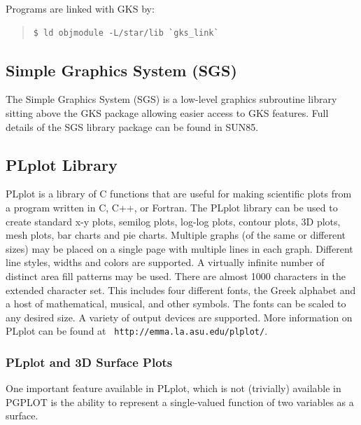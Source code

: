 \documentclass[twoside,11pt]{article}
\newcommand{\htmlref}[2]{#1}
\newcommand{\latex}[1]{#1}
\newcommand{\xref}[3]{#1}
\newcommand{\xlabel}[1]{}
\begin{document}
Programs are linked with GKS by:

\small
\begin{quote}
\begin{verbatim}
$ ld objmodule -L/star/lib `gks_link`
\end{verbatim}
\end{quote}
\normalsize

\subsection{\xlabel{sc15_sgs}Simple Graphics System (SGS)\label{sc15_sgs}}

The \xref{Simple Graphics System}{sun85}{} (SGS) is a low-level
graphics subroutine library sitting above the \htmlref{GKS}{sc15_gks}
package allowing easier access to GKS features. Full details of the
SGS library package can be found in \xref{SUN85}{sun85}{}.

\subsection{\xlabel{sc15_plplot}PLplot Library\label{sc15_plplot}}

PLplot is a library of C functions that are useful for making
scientific plots from a program written in C, C++, or Fortran. The
PLplot library can be used to create standard x-y plots, semilog
plots, log-log plots, contour plots, 3D plots, mesh plots, bar charts
and pie charts. Multiple graphs (of the same or different sizes) may
be placed on a single page with multiple lines in each graph.
Different line styles, widths and colors are supported. A virtually
infinite number of distinct area fill patterns may be used. There are
almost 1000 characters in the extended character set. This includes
four different fonts, the Greek alphabet and a host of mathematical,
musical, and other symbols. The fonts can be scaled to any desired
size. A variety of output devices are supported. \latex{More
information on PLplot can be found at {\tt
http://emma.la.asu.edu/plplot/}.}

\subsubsection{PLplot and 3D Surface Plots}

One important feature available in PLplot, which is not (trivially)
available in PGPLOT is the ability to represent a single-valued
function of two variables as a surface.
\end{document}
